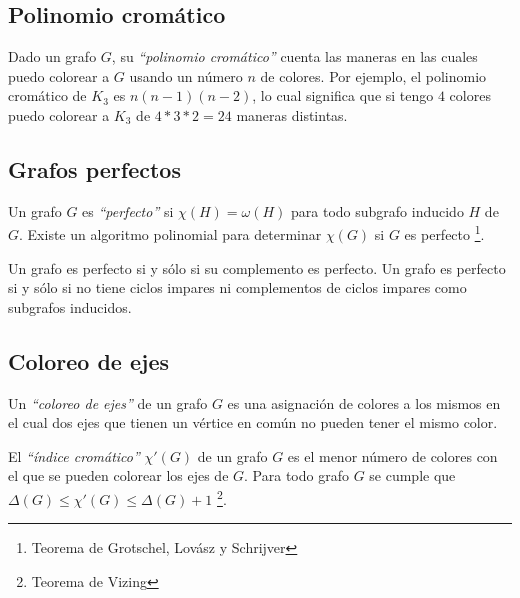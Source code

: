 \subsection{Polinomio crom\'atico}

Dado un grafo $G$, su \emph{``polinomio crom\'atico''} cuenta las maneras en las cuales puedo colorear a $G$ usando un n\'umero $n$ de colores. Por ejemplo, el polinomio crom\'atico de $K_3$ es $n(n-1)(n-2)$, lo cual significa que si tengo $4$ colores puedo colorear a $K_3$ de $4*3*2=24$ maneras distintas.

\subsection{Grafos perfectos}

Un grafo $G$ es \emph{``perfecto''} si $\chi(H) = \omega(H)$ para todo subgrafo inducido $H$ de $G$. Existe un algoritmo polinomial para determinar $\chi(G)$ si $G$ es perfecto \footnote{Teorema de Grotschel, Lov\'asz y Schrijver}.

Un grafo es perfecto si y s\'olo si su complemento es perfecto. Un grafo es perfecto si y s\'olo si no tiene ciclos impares ni complementos de ciclos impares como subgrafos inducidos.

\subsection{Coloreo de ejes}

Un \emph{``coloreo de ejes''} de un grafo $G$ es una asignaci\'on de colores a los mismos en el cual dos ejes que tienen un v\'ertice en com\'un no pueden tener el mismo color.

El \emph{``\'indice crom\'atico''} $\chi'(G)$ de un grafo $G$ es el menor n\'umero de colores con el que se pueden colorear los ejes de $G$. Para todo grafo $G$ se cumple que $\Delta(G) \leq \chi'(G) \leq \Delta(G) + 1$ \footnote{Teorema de Vizing}.

